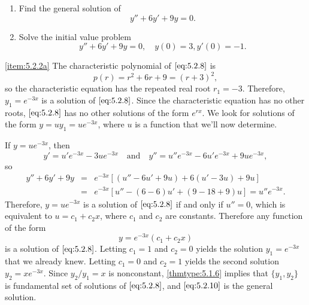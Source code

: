 \documentclass{ximera}
\begin{document}
\begin{example}\label{example:5.2.2}
\begin{enumerate}
\item\label{item:5.2.2a}%
Find the general solution of
\begin{equation} \label{eq:5.2.8}
y''+6y'+9y=0.
\end{equation}
 
\item\label{item:5.2.2b}%
Solve the initial value problem
\begin{equation} \label{eq:5.2.9}
y''+6y'+9y=0, \quad   y(0)=3,  y'(0)=-1.
\end{equation}
\end{enumerate}
 
\begin{explanation}
\ref{item:5.2.2a}  The characteristic polynomial of
$\eqref{eq:5.2.8}$ is
$$
p(r)=r^2+6r+9=(r+3)^2,
$$
so the characteristic equation has the repeated real root $r_1=-3$.
Therefore, $y_1=e^{-3x}$ is a solution of $\eqref{eq:5.2.8}$. Since the
characteristic equation has no other roots, $\eqref{eq:5.2.8}$
has no other solutions of the form $e^{rx}$.
 We  look for  solutions of the form
$y=uy_1=ue^{-3x}$,
where $u$ is a function that we'll now
determine.
 
If $y=ue^{-3x}$, then
$$
y'=u'e^{-3x}-3ue^{-3x}\quad\mbox{and}\quad
y''=u''e^{-3x}-6u'e^{-3x}+9ue^{-3x},
$$
so
\begin{eqnarray*}
y''+6y'+9y&=&e^{-3x}\left[(u''-6u'+9u)+6(u'-3u)+9u\right]\\
&=&e^{-3x}\left[u''-(6-6)u'+(9-18+9)u\right]=u''e^{-3x}.
\end{eqnarray*}
Therefore, $y=ue^{-3x}$ is a solution of $\eqref{eq:5.2.8}$ if and only if
$u''=0$, which is equivalent to $u=c_1+c_2x$, where $c_1$ and $c_2$
are constants. Therefore any function of the form
\begin{equation} \label{eq:5.2.10}
y=e^{-3x}(c_1+c_2x)
\end{equation}
is  a solution of $\eqref{eq:5.2.8}$.
Letting $c_1=1$ and $c_2=0$  yields the solution
 $y_1=e^{-3x}$ that we already knew. Letting $c_1=0$ and $c_2=1$
yields the second solution $y_2=xe^{-3x}$. Since
$y_2/y_1=x$
is nonconstant, \ref{thmtype:5.1.6} implies that   $\{y_1,y_2\}$ is
fundamental set of solutions of $\eqref{eq:5.2.8}$, and $\eqref{eq:5.2.10}$
is the general solution.
 

\end{explanation}
\end{example}
\end{document}

